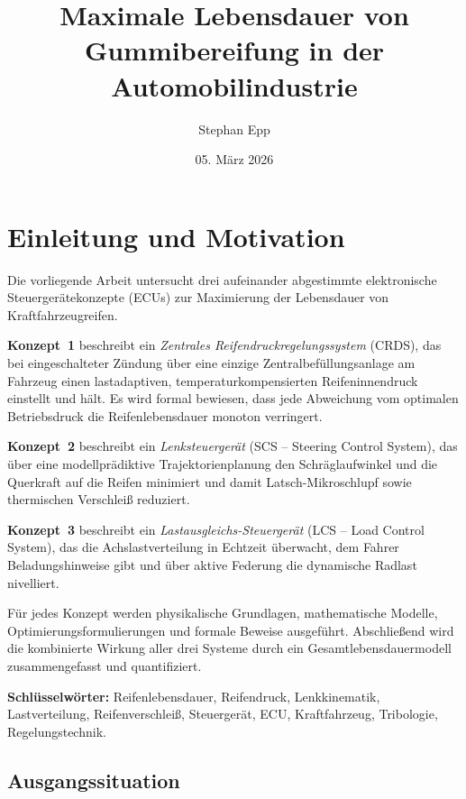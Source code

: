 ﻿\documentclass[12pt,a4paper]{article}
\title{\textbf{Maximale Lebensdauer von Gummibereifung in der Automobilindustrie}}
\author{Stephan Epp}
\date{05. März 2026}
\theoremstyle{definition}
\theoremstyle{remark}
\begin{document}
\maketitle

\tableofcontents
\newpage

\section{Einleitung und Motivation}

Die vorliegende Arbeit untersucht drei aufeinander abgestimmte
elektronische Steuergerätekonzepte (ECUs) zur Maximierung der
Lebensdauer von Kraftfahrzeugreifen.

\textbf{Konzept~1} beschreibt ein \emph{Zentrales Reifendruckregelungssystem} (CRDS),
das bei eingeschalteter Zündung über eine einzige Zentralbefüllungsanlage am Fahrzeug
einen lastadaptiven, temperaturkompensierten Reifeninnendruck einstellt und hält.
Es wird formal bewiesen, dass jede Abweichung vom optimalen Betriebsdruck
die Reifenlebensdauer monoton verringert.

\textbf{Konzept~2} beschreibt ein \emph{Lenksteuergerät} (SCS -- Steering Control
System), das über eine modellprädiktive Trajektorienplanung den Schräglaufwinkel
und die Querkraft auf die Reifen minimiert und damit Latsch-Mikroschlupf
sowie thermischen Verschleiß reduziert.

\textbf{Konzept~3} beschreibt ein \emph{Lastausgleichs-Steuergerät} (LCS -- Load
Control System), das die Achslastverteilung in Echtzeit überwacht, dem Fahrer
Beladungshinweise gibt und über aktive Federung die dynamische Radlast
nivelliert.

Für jedes Konzept werden physikalische Grundlagen, mathematische Modelle,
Optimierungsformulierungen und formale Beweise ausgeführt.
Abschließend wird die kombinierte Wirkung aller drei Systeme durch
ein Gesamtlebensdauermodell zusammengefasst und quantifiziert.

\textbf{Schlüsselwörter:}
Reifenlebensdauer, Reifendruck, Lenkkinematik, Lastverteilung,
Reifenverschleiß, Steuergerät, ECU, Kraftfahrzeug, Tribologie,
Regelungstechnik.

\subsection{Ausgangssituation}
\end{document}
